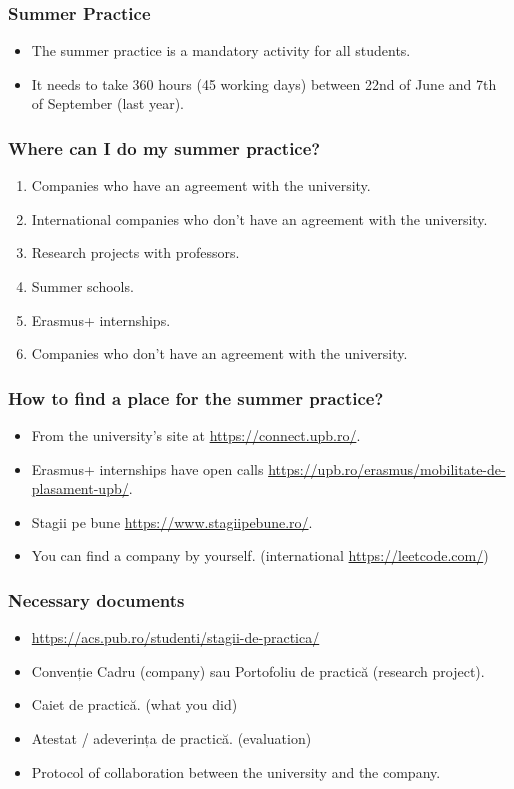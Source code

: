 \begin{frame}
\frametitle{Summer Practice}
\begin{itemize}
    \item The summer practice is a mandatory activity for all students.
    \item It needs to take 360 hours (45 working days) between 22nd of June and 7th of September (last year).
\end{itemize}
\end{frame}

\begin{frame}
\frametitle{Where can I do my summer practice?}
\begin{enumerate}
    \item Companies who have an agreement with the university.
    \item International companies who don't have an agreement with the university.
    \item Research projects with professors.
    \item Summer schools.
    \item Erasmus+ internships.
    \item Companies who don't have an agreement with the university.
\end{enumerate}
\end{frame}

\begin{frame}
\frametitle{How to find a place for the summer practice?}
\begin{itemize}
    \item From the university's site at \url{https://connect.upb.ro/}.
    \item Erasmus+ internships have open calls \url{https://upb.ro/erasmus/mobilitate-de-plasament-upb/}.
    \item Stagii pe bune \url{https://www.stagiipebune.ro/}.
    \item You can find a company by yourself. (international \url{https://leetcode.com/})
\end{itemize}
\end{frame}

\begin{frame}
\frametitle{Necessary documents}
\begin{itemize}
    \item \url{https://acs.pub.ro/studenti/stagii-de-practica/}
    \item Convenție Cadru (company) sau Portofoliu de practică (research project).
    \item Caiet de practică. (what you did)
    \item Atestat / adeverința de practică. (evaluation)
    \item Protocol of collaboration  between the university and the company.
\end{itemize}
\end{frame}
